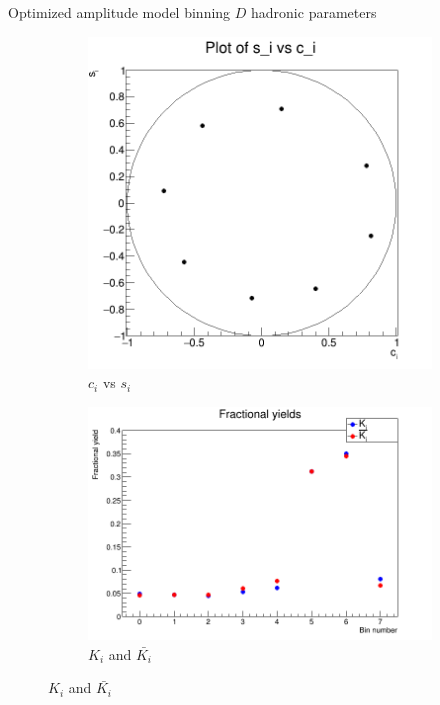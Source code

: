 \documentclass{beamer}
\begin{document}
\begin{frame}{Optimized amplitude model binning $D$ hadronic parameters}
  \begin{figure}
    \centering
    \vspace{-0.2cm}
    \begin{subfigure}{0.5\textwidth}
      \includegraphics[width = 1.0\textwidth]{OptimizedAmplitude_8_cs.png}
      \caption{$c_i$ vs $s_i$}
    \end{subfigure}%
    \begin{subfigure}{0.5\textwidth}
      \includegraphics[width = 1.0\textwidth]{OptimizedAmplitude_8_KKbar.png}
      \caption{$K_i$ and $\bar{K_i}$}
    \end{subfigure}
  \end{figure}
\end{frame}
\end{document}

